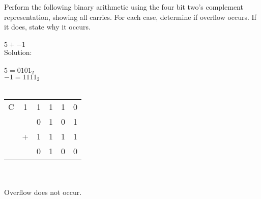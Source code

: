 Perform the following binary arithmetic using the four bit two's complement representation, showing all carries.  For each case, determine if overflow occurs. If it does, state why it occurs.
\\
\\
$5 + -1$\\

Solution: \\
\\
$5 = 0101_2$\\
$-1 = 1111_2$\\
\\
\begin{tabular}{cccccc}
  C & 1 & 1 & 1 & 1 & 0 \\
    &   & 0 & 1 & 0 & 1 \\
    & + & 1 & 1 & 1 & 1 \\
  \hline
    &   & 0 & 1 & 0 & 0 \\
\end{tabular} \\
\\
Overflow does not occur.\\
